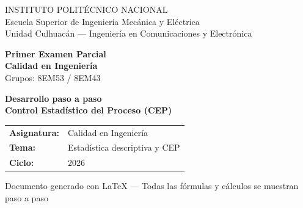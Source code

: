 \documentclass[12pt,letterpaper]{article}
\begin{document}
\begin{titlepage}
  \centering
  \vspace*{1cm}
  \begin{tcolorbox}[tituloStyle, width=\linewidth]
    \centering
    INSTITUTO POLIT\'ECNICO NACIONAL\\[4pt]
    {\normalsize Escuela Superior de Ingenier\'ia Mec\'anica y El\'ectrica\\
     Unidad Culhuac\'an --- Ingenier\'ia en Comunicaciones y Electr\'onica}
  \end{tcolorbox}

  \vspace{0.6cm}
  {\LARGE\bfseries\color{azulprin} Primer Examen Parcial}\\[0.3cm]
  {\Large\bfseries\color{azulmedio} Calidad en Ingenier\'ia}\\[0.2cm]
  {\large Grupos: 8EM53 / 8EM43}\\[0.8cm]

  \begin{tcolorbox}[enhanced, colback=grisclaro, colframe=azulborde,
      arc=5pt, boxrule=1pt, width=0.85\linewidth]
    \centering
    {\Large\bfseries\color{azulprin}
      Desarrollo paso a paso\\[4pt]
      Control Estad\'istico del Proceso (CEP)}
  \end{tcolorbox}

  \vspace{1.2cm}
  \begin{tcolorbox}[enhanced, colback=white, colframe=grismedio,
      arc=4pt, boxrule=0.8pt, width=0.75\linewidth]
    \begin{tabular}{ll}
      \textbf{Asignatura:} & Calidad en Ingenier\'ia \\[4pt]
      \textbf{Tema:}       & Estad\'istica descriptiva y CEP \\[4pt]
      \textbf{Ciclo:}      & 2026 \\
    \end{tabular}
  \end{tcolorbox}

  \vfill
  {\small\color{grismedio} Documento generado con \LaTeX{} ---
   Todas las f\'ormulas y c\'alculos se muestran paso a paso}
\end{titlepage}

\tableofcontents
\newpage

\end{document}
